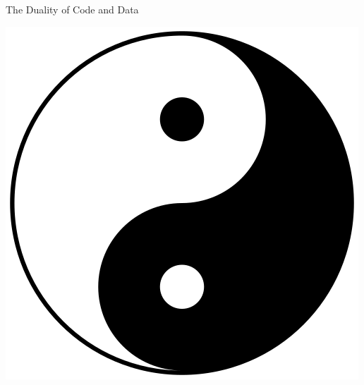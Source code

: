 \documentclass[pdf]{beamer}
\begin{document}
\begin{frame}{The Duality of Code and Data}
  \begin{center}
    \includegraphics[scale=0.28]{images/yin-yang}
  \end{center}
\end{frame}


\end{document}
